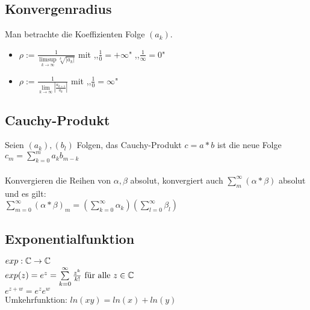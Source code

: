 \documentclass[german]{latex4ei/latex4ei_sheet}
\begin{document}
\begin{sectionbox}
	\subsection{Konvergenradius}
	Man betrachte die Koeffizienten Folge $(a_k)$.\\
	\begin{itemize}
	\item $\rho := \frac{1}{\limsup\limits_{k \to \infty}\sqrt[k]{|a_k|}}$ mit ,,$\frac{1}{0}=+\infty$"  ,,$\frac{1}{\infty}=0$"
	\item  $\rho := \frac{1}{\lim\limits_{k \to \infty}|\frac{a_{k+1}}{a_k}|} $ mit ,,$\frac{1}{0}=\infty$"
	\end{itemize}

\end{sectionbox}

\begin{sectionbox}
	\subsection{Cauchy-Produkt}
	Seien $(a_k),(b_l)$ Folgen, das Cauchy-Produkt $c=a*b$ ist die neue Folge $c_m = \sum\limits_{k=0}^{m}a_k b_{m-k}$\\ \\
	Konvergieren die Reihen von $\alpha,\beta$ absolut, konvergiert auch  $\sum_{m}^{\infty}(\alpha * \beta)$ absolut und es gilt: \\
	$\sum\limits_{m=0}^{\infty}(\alpha * \beta)_m =(\sum\limits_{k=0}^{\infty}\alpha_k)(\sum\limits_{l=0}^{\infty}\beta_l)$

\end{sectionbox}

\begin{sectionbox}
	\subsection{Exponentialfunktion}
	$exp:\mathbb C\rightarrow\mathbb C$\\
	$exp(z)=e^z=\sum\limits_{k=0}^{\infty}\frac{z^k}{k!} \text{ für alle } z \in \mathbb C$\\
	$e^{z+w}=e^ze^w$\\
	Umkehrfunktion: $ln(xy)=ln(x)+ln(y)$

\end{sectionbox}
\end{document}
